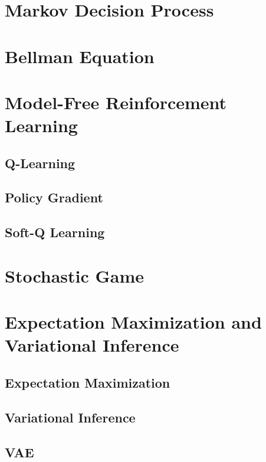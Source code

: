\section{Markov Decision Process}

\section{Bellman Equation}

\section{Model-Free Reinforcement Learning}
\subsection{Q-Learning}
\subsection{Policy Gradient}
\subsection{Soft-Q Learning}

\section{Stochastic Game}

\section{Expectation Maximization and Variational Inference}
\subsection{Expectation Maximization}
\subsection{Variational Inference}
\subsection{VAE}